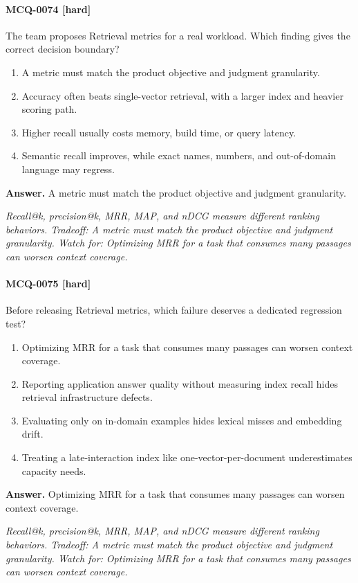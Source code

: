 \paragraph{MCQ-0074 [hard]} The team proposes Retrieval metrics for a real workload. Which finding gives the correct decision boundary?
\begin{enumerate}[label=\Alph*.]
\item A metric must match the product objective and judgment granularity.
\item Accuracy often beats single-vector retrieval, with a larger index and heavier scoring path.
\item Higher recall usually costs memory, build time, or query latency.
\item Semantic recall improves, while exact names, numbers, and out-of-domain language may regress.
\end{enumerate}
\noindent\textbf{Answer.} A metric must match the product objective and judgment granularity.
\par\textit{Recall@k, precision@k, MRR, MAP, and nDCG measure different ranking behaviors. Tradeoff: A metric must match the product objective and judgment granularity. Watch for: Optimizing MRR for a task that consumes many passages can worsen context coverage.}
\paragraph{MCQ-0075 [hard]} Before releasing Retrieval metrics, which failure deserves a dedicated regression test?
\begin{enumerate}[label=\Alph*.]
\item Optimizing MRR for a task that consumes many passages can worsen context coverage.
\item Reporting application answer quality without measuring index recall hides retrieval infrastructure defects.
\item Evaluating only on in-domain examples hides lexical misses and embedding drift.
\item Treating a late-interaction index like one-vector-per-document underestimates capacity needs.
\end{enumerate}
\noindent\textbf{Answer.} Optimizing MRR for a task that consumes many passages can worsen context coverage.
\par\textit{Recall@k, precision@k, MRR, MAP, and nDCG measure different ranking behaviors. Tradeoff: A metric must match the product objective and judgment granularity. Watch for: Optimizing MRR for a task that consumes many passages can worsen context coverage.}
